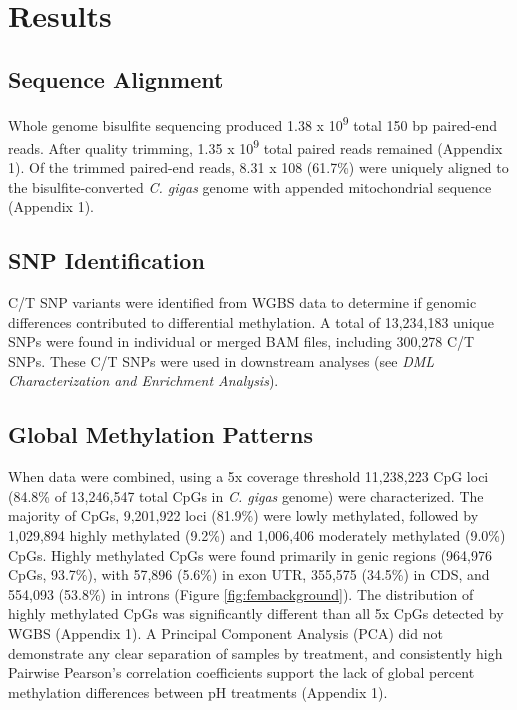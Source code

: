 \documentclass [11pt, proquest] {uwthesis}[2015/03/03]
\begin{document}
\hypertarget{results-2}{%
\section{Results}\label{results-2}}

\hypertarget{sequence-alignment-1}{%
\subsection{Sequence Alignment}\label{sequence-alignment-1}}

Whole genome bisulfite sequencing produced 1.38 x 10\textsuperscript{9} total 150 bp paired-end reads. After quality trimming, 1.35 x 10\textsuperscript{9} total paired reads remained (Appendix 1). Of the trimmed paired-end reads, 8.31 x 108 (61.7\%) were uniquely aligned to the bisulfite-converted \emph{C. gigas} genome with appended mitochondrial sequence (Appendix 1).

\hypertarget{snp-identification-1}{%
\subsection{SNP Identification}\label{snp-identification-1}}

C/T SNP variants were identified from WGBS data to determine if genomic differences contributed to differential methylation. A total of 13,234,183 unique SNPs were found in individual or merged BAM files, including 300,278 C/T SNPs. These C/T SNPs were used in downstream analyses (see \emph{DML Characterization and Enrichment Analysis}).

\hypertarget{global-methylation-patterns}{%
\subsection{Global Methylation Patterns}\label{global-methylation-patterns}}

When data were combined, using a 5x coverage threshold 11,238,223 CpG loci (84.8\% of 13,246,547 total CpGs in \emph{C. gigas} genome) were characterized. The majority of CpGs, 9,201,922 loci (81.9\%) were lowly methylated, followed by 1,029,894 highly methylated (9.2\%) and 1,006,406 moderately methylated (9.0\%) CpGs. Highly methylated CpGs were found primarily in genic regions (964,976 CpGs, 93.7\%), with 57,896 (5.6\%) in exon UTR, 355,575 (34.5\%) in CDS, and 554,093 (53.8\%) in introns (Figure \ref{fig:fembackground}). The distribution of highly methylated CpGs was significantly different than all 5x CpGs detected by WGBS (Appendix 1). A Principal Component Analysis (PCA) did not demonstrate any clear separation of samples by treatment, and consistently high Pairwise Pearson's correlation coefficients support the lack of global percent methylation differences between pH treatments (Appendix 1).
\end{document}
